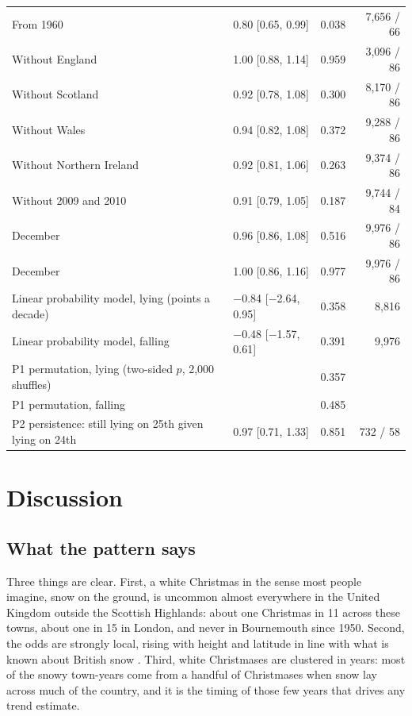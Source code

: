 \documentclass[11pt,a4paper]{article}
\begin{document}
\begin{table}[tbp]
\begin{tabular}{p{7.6cm}lrr}
\quad From 1960 & 0.80 [0.65, 0.99] & 0.038 & 7,656 / 66\\
\quad Without England & 1.00 [0.88, 1.14] & 0.959 & 3,096 / 86\\
\quad Without Scotland & 0.92 [0.78, 1.08] & 0.300 & 8,170 / 86\\
\quad Without Wales & 0.94 [0.82, 1.08] & 0.372 & 9,288 / 86\\
\quad Without Northern Ireland & 0.92 [0.81, 1.06] & 0.263 & 9,374 / 86\\
\quad Without 2009 and 2010 & 0.91 [0.79, 1.05] & 0.187 & 9,744 / 84\\
\quad 24 December & 0.96 [0.86, 1.08] & 0.516 & 9,976 / 86\\
\quad 26 December & 1.00 [0.86, 1.16] & 0.977 & 9,976 / 86\\
\midrule Linear probability model, lying (points a decade) & $-$0.84 [$-$2.64, 0.95] & 0.358 & 8,816\\
Linear probability model, falling & $-$0.48 [$-$1.57, 0.61] & 0.391 & 9,976\\
P1 permutation, lying (two-sided $p$, 2,000 shuffles) & & 0.357 & \\
P1 permutation, falling & & 0.485 & \\
P2 persistence: still lying on 25th given lying on 24th & 0.97 [0.71, 1.33] & 0.851 & 732 / 58\\
\bottomrule\end{tabular}\end{table}

\section{Discussion}\label{sec:disc}
\subsection{What the pattern says}
Three things are clear. First, a white Christmas in the sense most people imagine, snow on the ground, is uncommon almost everywhere in the United Kingdom outside the Scottish Highlands: about one Christmas in 11 across these towns, about one in 15 in London, and never in Bournemouth since 1950. Second, the odds are strongly local, rising with height and latitude in line with what is known about British snow \citep{kay2016,brown2019}. Third, white Christmases are clustered in years: most of the snowy town-years come from a handful of Christmases when snow lay across much of the country, and it is the timing of those few years that drives any trend estimate.
\end{document}
